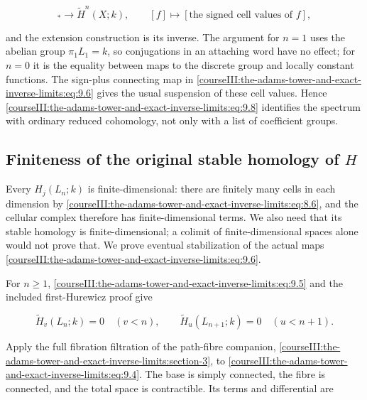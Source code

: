 \begin{equation}
[X,L_n]_*\longrightarrow\widetilde H^n(X;k),
 \qquad [f]\longmapsto
 [\text{the signed cell values of }f],
 \label{courseIII:the-adams-tower-and-exact-inverse-limits:eq:9.8}
\end{equation}

and the extension construction is its inverse. The argument for \(n=1\) uses the abelian group \(\pi_1L_1=k\), so conjugations in an attaching word have no effect; for \(n=0\) it is the equality between maps to the discrete group and locally constant functions. The sign-plus connecting map in \eqref{courseIII:the-adams-tower-and-exact-inverse-limits:eq:9.6} gives the usual suspension of these cell values. Hence \eqref{courseIII:the-adams-tower-and-exact-inverse-limits:eq:9.8} identifies the spectrum with ordinary reduced cohomology, not only with a list of coefficient groups.

\subsection{Finiteness of the original stable homology of \(H\)}
\label{courseIII:the-adams-tower-and-exact-inverse-limits:adams-stable-homology}

\label{courseIII:the-adams-tower-and-exact-inverse-limits:section-10}\label{courseIII:adams-tower:10}

Every \(H_j(L_n;k)\) is finite-dimensional: there are finitely many cells in each dimension by \eqref{courseIII:the-adams-tower-and-exact-inverse-limits:eq:8.6}, and the cellular complex therefore has finite-dimensional terms. We also need that its stable homology is finite-dimensional; a colimit of finite-dimensional spaces alone would not prove that. We prove eventual stabilization of the actual maps \eqref{courseIII:the-adams-tower-and-exact-inverse-limits:eq:9.6}.

For \(n\geq1\), \eqref{courseIII:the-adams-tower-and-exact-inverse-limits:eq:9.5} and the included first-Hurewicz proof give

\begin{equation}
\widetilde H_v(L_n;k)=0\quad(v<n),\qquad
 \widetilde H_u(L_{n+1};k)=0\quad(u<n+1).
 \label{courseIII:the-adams-tower-and-exact-inverse-limits:eq:10.1}
\end{equation}

Apply the full fibration filtration of the path-fibre companion, \cref{courseIII:the-adams-tower-and-exact-inverse-limits:section-3}, to \eqref{courseIII:the-adams-tower-and-exact-inverse-limits:eq:9.4}. The base is simply connected, the fibre is connected, and the total space is contractible. Its terms and differential are

